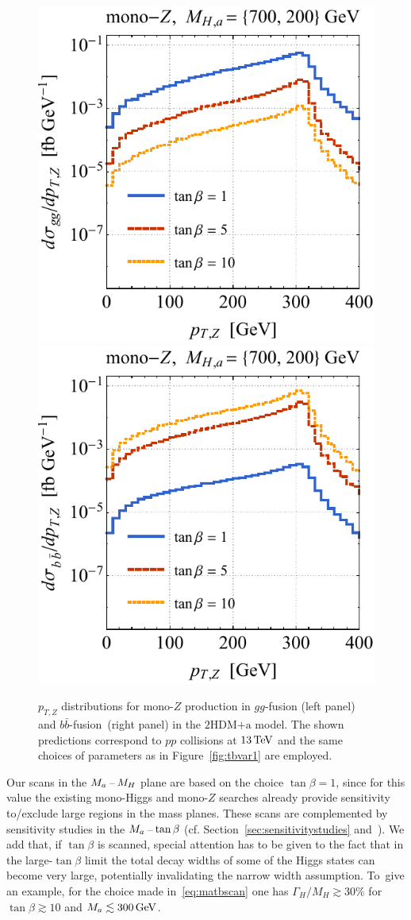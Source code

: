 \documentclass[a4paper, 11pt,notoc]{article}
\newcommand{\ma}{\ensuremath{M_{a}}\xspace}
\newcommand{\hdma}{\ensuremath{\textrm{2HDM+a}}\xspace}
\begin{document}
 \begin{figure}[t!]
\centering
\includegraphics[height=0.45\textwidth]{tblz.pdf} \qquad 
\includegraphics[height=0.45\textwidth]{tbrz.pdf}
\vspace{2mm}
\vspace{2mm}
\caption{\label{fig:tbvar2} 
$p_{T,Z}$ distributions for mono-$Z$ production in $gg$-fusion (left panel) and $b \bar b$-fusion~(right panel) in the \hdma model. The shown predictions correspond to $pp$ collisions at $13 \, {\rm TeV}$ and the same choices of parameters as in Figure~\ref{fig:tbvar1} are employed.}
\end{figure}

Our  scans in the $M_{a}\hspace{0.5mm}$--$\hspace{0.5mm} M_H$ plane are based on the choice $\tan \beta = 1$, since for this value the existing mono-Higgs and mono-$Z$ searches already provide sensitivity to/exclude large regions in the mass planes.  These  scans are complemented by sensitivity studies in the $\ma \hspace{0.5mm}$--$\hspace{0.5mm} \tan \beta$ (cf. Section~\ref{sec:sensitivitystudies} and~\cite{No:2015xqa,Bauer:2017ota,Pani:2017qyd}).  We add that, if $\tan \beta$ is scanned, special attention has to be given to the fact that in the large-$\tan \beta$ limit the total decay widths of some of the Higgs states can become very large, potentially invalidating the narrow width assumption.   To~give an example, for the choice made in~\eqref{eq:matbscan} one has $\Gamma_{H}/M_H \gtrsim 30\%$ for $\tan \beta \gtrsim 10$ and $M_a \lesssim 300 \, {\rm GeV}$. 
\end{document}
